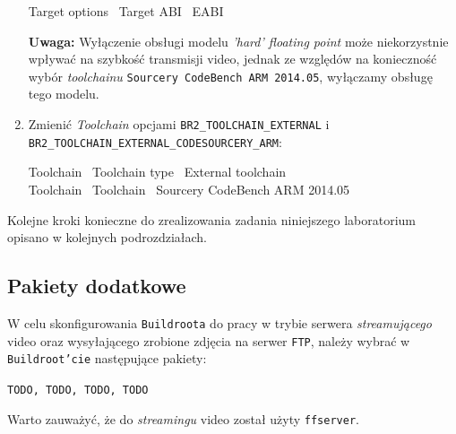 \documentclass{article}
\newenvironment{ttblock}{\ttfamily}{\par}
\begin{document}
\begin{enumerate}
\begin{ttblock}
Target options \textrightarrow\ Target ABI \textrightarrow\ EABI
\end{ttblock}
\textbf{Uwaga:} Wyłączenie obsługi modelu \emph{'hard' floating point} może niekorzystnie wpływać na szybkość transmisji video, jednak ze względów na konieczność wybór \emph{toolchainu} \texttt{Sourcery CodeBench ARM 2014.05}, wyłączamy obsługę tego modelu.

\item Zmienić \emph{Toolchain} opcjami \texttt{BR2\_TOOLCHAIN\_EXTERNAL} i\\ \texttt{BR2\_TOOLCHAIN\_EXTERNAL\_CODESOURCERY\_ARM}:

\begin{ttblock}
Toolchain \textrightarrow\ Toolchain type \textrightarrow\ External toolchain\\
Toolchain \textrightarrow\ Toolchain \textrightarrow\ Sourcery CodeBench ARM 2014.05
\end{ttblock}

%
\end{enumerate}

Kolejne kroki konieczne do zrealizowania zadania niniejszego laboratorium opisano w kolejnych podrozdziałach.


\subsection{Pakiety dodatkowe}

W celu skonfigurowania \texttt{Buildroota} do pracy w trybie serwera \emph{streamującego} video oraz wysyłającego zrobione zdjęcia na serwer \texttt{FTP}, należy wybrać w \texttt{Buildroot'cie} następujące pakiety:
\begin{center}
\texttt{TODO, TODO, TODO, TODO}
\end{center}
Warto zauważyć, że do \emph{streamingu} video został użyty \texttt{ffserver}.
\end{document}
